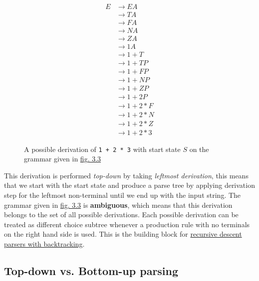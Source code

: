 \begin{figure}[h]
    \begin{equation}
        \begin{split}
            E &\rightarrow EA\\
            &\rightarrow TA\\
            &\rightarrow FA\\
            &\rightarrow NA\\
            &\rightarrow ZA\\
            &\rightarrow 1 A\\
            &\rightarrow 1 + T\\
            &\rightarrow 1 + TP\\
            &\rightarrow 1 + FP\\
            &\rightarrow 1 + NP\\
            &\rightarrow 1 + ZP\\
            &\rightarrow 1 + 2 P\\
            &\rightarrow 1 + 2 * F\\
            &\rightarrow 1 + 2 * N\\
            &\rightarrow 1 + 2 * Z\\
            &\rightarrow 1 + 2 * 3
        \end{split}
        \nonumber
    \end{equation}
    \vspace{-1.5em}
    \cprotect\caption{\label{fig:3.4}A possible derivation of \verb|1 + 2 * 3| with start state $S$ on the grammar given in \hyperref[fig:3.3]{fig. 3.3}}
\end{figure}

This derivation is performed \textit{top-down} by taking \textit{leftmost derivation}, this means that we start with the start state and produce a parse tree by applying derivation step for the leftmost non-terminal until we end up with the input string. The grammar given in \hyperref[fig:3.3]{fig. 3.3} is \textbf{ambiguous}, which means that this derivation belongs to the set of all possible derivations. Each possible derivation can be treated as different choice subtree whenever a production rule with no terminals on the right hand side is used. This is the building block for \hyperref[sec:top-down]{recursive descent parsers with backtracking}.

\subsection{Top-down vs. Bottom-up parsing}

